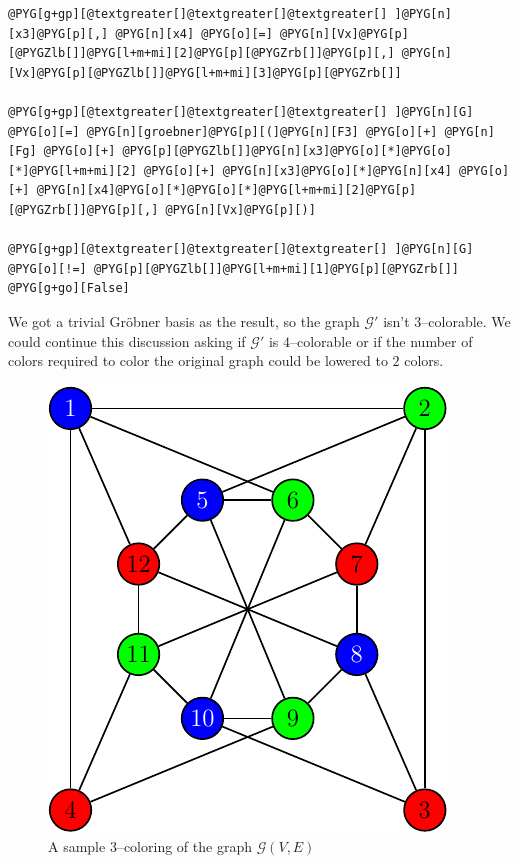 \begin{Verbatim}[commandchars=@\[\]]
@PYG[g+gp][@textgreater[]@textgreater[]@textgreater[] ]@PYG[n][x3]@PYG[p][,] @PYG[n][x4] @PYG[o][=] @PYG[n][Vx]@PYG[p][@PYGZlb[]]@PYG[l+m+mi][2]@PYG[p][@PYGZrb[]]@PYG[p][,] @PYG[n][Vx]@PYG[p][@PYGZlb[]]@PYG[l+m+mi][3]@PYG[p][@PYGZrb[]]

@PYG[g+gp][@textgreater[]@textgreater[]@textgreater[] ]@PYG[n][G] @PYG[o][=] @PYG[n][groebner]@PYG[p][(]@PYG[n][F3] @PYG[o][+] @PYG[n][Fg] @PYG[o][+] @PYG[p][@PYGZlb[]]@PYG[n][x3]@PYG[o][*]@PYG[o][*]@PYG[l+m+mi][2] @PYG[o][+] @PYG[n][x3]@PYG[o][*]@PYG[n][x4] @PYG[o][+] @PYG[n][x4]@PYG[o][*]@PYG[o][*]@PYG[l+m+mi][2]@PYG[p][@PYGZrb[]]@PYG[p][,] @PYG[n][Vx]@PYG[p][)]

@PYG[g+gp][@textgreater[]@textgreater[]@textgreater[] ]@PYG[n][G] @PYG[o][!=] @PYG[p][@PYGZlb[]]@PYG[l+m+mi][1]@PYG[p][@PYGZrb[]]
@PYG[g+go][False]
\end{Verbatim}
\noindent
We got a trivial Gröbner basis as the result, so the graph $\mathcal{G'}$ isn't $3$--colorable. We
could continue this discussion asking if $\mathcal{G'}$ is $4$--colorable or if the number of colors
required to color the original graph could be lowered to $2$ colors.
\begin{figure}[htbp]
\centering

\includegraphics{graph-color.pdf}
\caption{A sample $3$--coloring of the graph $\mathcal{G}(V, E)$\label{fig-graph-color}}\end{figure}

